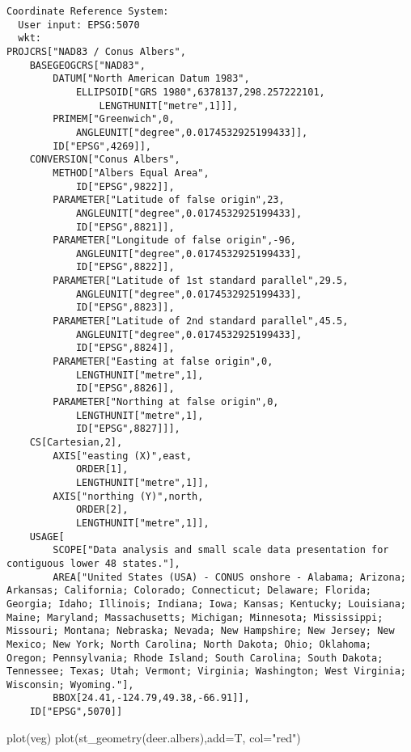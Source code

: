 \documentclass[
  letterpaper,
]{book}
\newenvironment{Shaded}{\begin{snugshade}}{\end{snugshade}}
\newcommand{\AttributeTok}[1]{\textcolor[rgb]{0.40,0.45,0.13}{#1}}
\newcommand{\FunctionTok}[1]{\textcolor[rgb]{0.28,0.35,0.67}{#1}}
\newcommand{\NormalTok}[1]{\textcolor[rgb]{0.00,0.23,0.31}{#1}}
\newcommand{\StringTok}[1]{\textcolor[rgb]{0.13,0.47,0.30}{#1}}
\begin{document}
\begin{verbatim}
Coordinate Reference System:
  User input: EPSG:5070 
  wkt:
PROJCRS["NAD83 / Conus Albers",
    BASEGEOGCRS["NAD83",
        DATUM["North American Datum 1983",
            ELLIPSOID["GRS 1980",6378137,298.257222101,
                LENGTHUNIT["metre",1]]],
        PRIMEM["Greenwich",0,
            ANGLEUNIT["degree",0.0174532925199433]],
        ID["EPSG",4269]],
    CONVERSION["Conus Albers",
        METHOD["Albers Equal Area",
            ID["EPSG",9822]],
        PARAMETER["Latitude of false origin",23,
            ANGLEUNIT["degree",0.0174532925199433],
            ID["EPSG",8821]],
        PARAMETER["Longitude of false origin",-96,
            ANGLEUNIT["degree",0.0174532925199433],
            ID["EPSG",8822]],
        PARAMETER["Latitude of 1st standard parallel",29.5,
            ANGLEUNIT["degree",0.0174532925199433],
            ID["EPSG",8823]],
        PARAMETER["Latitude of 2nd standard parallel",45.5,
            ANGLEUNIT["degree",0.0174532925199433],
            ID["EPSG",8824]],
        PARAMETER["Easting at false origin",0,
            LENGTHUNIT["metre",1],
            ID["EPSG",8826]],
        PARAMETER["Northing at false origin",0,
            LENGTHUNIT["metre",1],
            ID["EPSG",8827]]],
    CS[Cartesian,2],
        AXIS["easting (X)",east,
            ORDER[1],
            LENGTHUNIT["metre",1]],
        AXIS["northing (Y)",north,
            ORDER[2],
            LENGTHUNIT["metre",1]],
    USAGE[
        SCOPE["Data analysis and small scale data presentation for contiguous lower 48 states."],
        AREA["United States (USA) - CONUS onshore - Alabama; Arizona; Arkansas; California; Colorado; Connecticut; Delaware; Florida; Georgia; Idaho; Illinois; Indiana; Iowa; Kansas; Kentucky; Louisiana; Maine; Maryland; Massachusetts; Michigan; Minnesota; Mississippi; Missouri; Montana; Nebraska; Nevada; New Hampshire; New Jersey; New Mexico; New York; North Carolina; North Dakota; Ohio; Oklahoma; Oregon; Pennsylvania; Rhode Island; South Carolina; South Dakota; Tennessee; Texas; Utah; Vermont; Virginia; Washington; West Virginia; Wisconsin; Wyoming."],
        BBOX[24.41,-124.79,49.38,-66.91]],
    ID["EPSG",5070]]
\end{verbatim}

\begin{Shaded}
\begin{Highlighting}[]
\FunctionTok{plot}\NormalTok{(veg)}
\FunctionTok{plot}\NormalTok{(}\FunctionTok{st\_geometry}\NormalTok{(deer.albers),}\AttributeTok{add=}\NormalTok{T, }\AttributeTok{col=}\StringTok{"red"}\NormalTok{)}
\end{Highlighting}
\end{Shaded}
\end{document}
